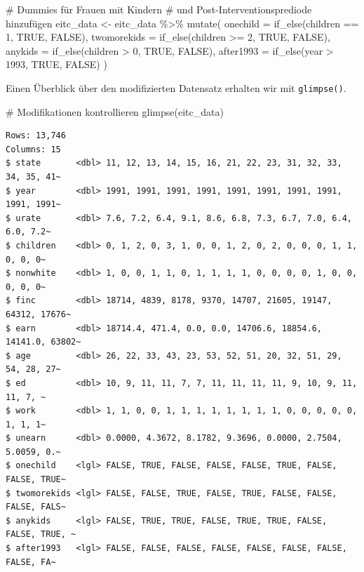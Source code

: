 \documentclass[
  a4paper,
  DIV=11,
  oneside]{scrreprt}
\newenvironment{Shaded}{\begin{snugshade}}{\end{snugshade}}
\newcommand{\AttributeTok}[1]{\textcolor[rgb]{0.40,0.45,0.13}{#1}}
\newcommand{\CommentTok}[1]{\textcolor[rgb]{0.37,0.37,0.37}{#1}}
\newcommand{\ConstantTok}[1]{\textcolor[rgb]{0.56,0.35,0.01}{#1}}
\newcommand{\DecValTok}[1]{\textcolor[rgb]{0.68,0.00,0.00}{#1}}
\newcommand{\FunctionTok}[1]{\textcolor[rgb]{0.28,0.35,0.67}{#1}}
\newcommand{\NormalTok}[1]{\textcolor[rgb]{0.00,0.23,0.31}{#1}}
\newcommand{\OtherTok}[1]{\textcolor[rgb]{0.00,0.23,0.31}{#1}}
\newcommand{\SpecialCharTok}[1]{\textcolor[rgb]{0.37,0.37,0.37}{#1}}
\begin{document}
\begin{Shaded}
\begin{Highlighting}[]
\CommentTok{\# Dummies für Frauen mit Kindern}
\CommentTok{\# und Post{-}Interventionsprediode hinzufügen }
\NormalTok{eitc\_data }\OtherTok{\textless{}{-}}\NormalTok{ eitc\_data }\SpecialCharTok{\%\textgreater{}\%}
  \FunctionTok{mutate}\NormalTok{(}
    \AttributeTok{onechild =} \FunctionTok{if\_else}\NormalTok{(children }\SpecialCharTok{==} \DecValTok{1}\NormalTok{, }\ConstantTok{TRUE}\NormalTok{, }\ConstantTok{FALSE}\NormalTok{),}
    \AttributeTok{twomorekids =} \FunctionTok{if\_else}\NormalTok{(children }\SpecialCharTok{\textgreater{}=} \DecValTok{2}\NormalTok{, }\ConstantTok{TRUE}\NormalTok{, }\ConstantTok{FALSE}\NormalTok{),}
    \AttributeTok{anykids =} \FunctionTok{if\_else}\NormalTok{(children }\SpecialCharTok{\textgreater{}} \DecValTok{0}\NormalTok{, }\ConstantTok{TRUE}\NormalTok{, }\ConstantTok{FALSE}\NormalTok{),}
    \AttributeTok{after1993 =} \FunctionTok{if\_else}\NormalTok{(year }\SpecialCharTok{\textgreater{}} \DecValTok{1993}\NormalTok{, }\ConstantTok{TRUE}\NormalTok{, }\ConstantTok{FALSE}\NormalTok{)}
\NormalTok{  )}
\end{Highlighting}
\end{Shaded}

Einen Überblick über den modifizierten Datensatz erhalten wir mit
\texttt{glimpse()}.

\begin{Shaded}
\begin{Highlighting}[]
\CommentTok{\# Modifikationen kontrollieren}
\FunctionTok{glimpse}\NormalTok{(eitc\_data)}
\end{Highlighting}
\end{Shaded}

\begin{verbatim}
Rows: 13,746
Columns: 15
$ state       <dbl> 11, 12, 13, 14, 15, 16, 21, 22, 23, 31, 32, 33, 34, 35, 41~
$ year        <dbl> 1991, 1991, 1991, 1991, 1991, 1991, 1991, 1991, 1991, 1991~
$ urate       <dbl> 7.6, 7.2, 6.4, 9.1, 8.6, 6.8, 7.3, 6.7, 7.0, 6.4, 6.0, 7.2~
$ children    <dbl> 0, 1, 2, 0, 3, 1, 0, 0, 1, 2, 0, 2, 0, 0, 0, 1, 1, 0, 0, 0~
$ nonwhite    <dbl> 1, 0, 0, 1, 1, 0, 1, 1, 1, 1, 0, 0, 0, 0, 1, 0, 0, 0, 0, 0~
$ finc        <dbl> 18714, 4839, 8178, 9370, 14707, 21605, 19147, 64312, 17676~
$ earn        <dbl> 18714.4, 471.4, 0.0, 0.0, 14706.6, 18854.6, 14141.0, 63802~
$ age         <dbl> 26, 22, 33, 43, 23, 53, 52, 51, 20, 32, 51, 29, 54, 28, 27~
$ ed          <dbl> 10, 9, 11, 11, 7, 7, 11, 11, 11, 11, 9, 10, 9, 11, 11, 7, ~
$ work        <dbl> 1, 1, 0, 0, 1, 1, 1, 1, 1, 1, 1, 1, 0, 0, 0, 0, 0, 1, 1, 1~
$ unearn      <dbl> 0.0000, 4.3672, 8.1782, 9.3696, 0.0000, 2.7504, 5.0059, 0.~
$ onechild    <lgl> FALSE, TRUE, FALSE, FALSE, FALSE, TRUE, FALSE, FALSE, TRUE~
$ twomorekids <lgl> FALSE, FALSE, TRUE, FALSE, TRUE, FALSE, FALSE, FALSE, FALS~
$ anykids     <lgl> FALSE, TRUE, TRUE, FALSE, TRUE, TRUE, FALSE, FALSE, TRUE, ~
$ after1993   <lgl> FALSE, FALSE, FALSE, FALSE, FALSE, FALSE, FALSE, FALSE, FA~
\end{verbatim}
\end{document}
